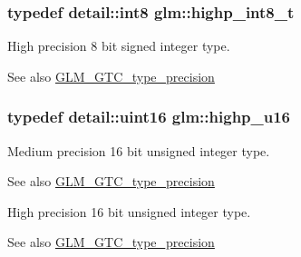 \subsubsection[{highp\+\_\+int8\+\_\+t}]{\setlength{\rightskip}{0pt plus 5cm}typedef detail\+::int8 {\bf glm\+::highp\+\_\+int8\+\_\+t}}\label{group__gtc__type__precision_ga417701b99e6e7992f35ab2ef694f88b2}
High precision 8 bit signed integer type. \begin{DoxySeeAlso}{See also}
\hyperlink{group__gtc__type__precision}{G\+L\+M\+\_\+\+G\+T\+C\+\_\+type\+\_\+precision} 
\end{DoxySeeAlso}
\hypertarget{group__gtc__type__precision_ga9da2178d7501d9c0f225fa1a7b70cb45}{}
\subsubsection[{highp\+\_\+u16}]{\setlength{\rightskip}{0pt plus 5cm}typedef {\bf detail\+::uint16} {\bf glm\+::highp\+\_\+u16}}\label{group__gtc__type__precision_ga9da2178d7501d9c0f225fa1a7b70cb45}
Medium precision 16 bit unsigned integer type. \begin{DoxySeeAlso}{See also}
\hyperlink{group__gtc__type__precision}{G\+L\+M\+\_\+\+G\+T\+C\+\_\+type\+\_\+precision}
\end{DoxySeeAlso}
High precision 16 bit unsigned integer type. \begin{DoxySeeAlso}{See also}
\hyperlink{group__gtc__type__precision}{G\+L\+M\+\_\+\+G\+T\+C\+\_\+type\+\_\+precision} 
\end{DoxySeeAlso}
\hypertarget{group__gtc__type__precision_gae8e8a2c712653891a03c171795286ac5}{}
